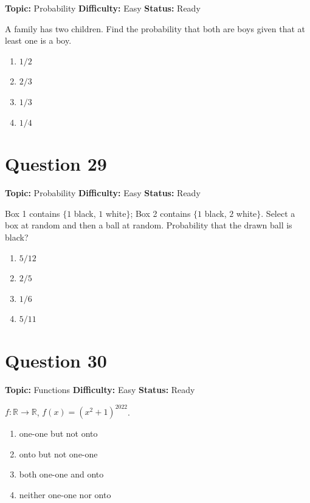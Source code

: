 \documentclass[11pt]{article}
\begin{document}
\noindent\textbf{Topic:} Probability \quad \textbf{Difficulty:} Easy \quad \textbf{Status:} Ready



A family has two children. Find the probability that both are boys given that at least one
is a boy.
\begin{enumerate}[label=(\Alph*)]
\item $1/2$
\item $2/3$
\item $1/3$
\item $1/4$
\end{enumerate}

\newpage

\section*{Question 29}


\noindent\textbf{Topic:} Probability \quad \textbf{Difficulty:} Easy \quad \textbf{Status:} Ready



Box 1 contains $\{1$ black, $1$ white$\}$; Box 2 contains $\{1$ black, $2$ white$\}$. Select a
box at random and then a ball at random. Probability that the drawn ball is black?
\begin{enumerate}[label=(\Alph*)]
\item $5/12$
\item $2/5$
\item $1/6$
\item $5/11$
\end{enumerate}

\newpage

\section*{Question 30}


\noindent\textbf{Topic:} Functions \quad \textbf{Difficulty:} Easy \quad \textbf{Status:} Ready



$f : \mathbb R \to \mathbb R$, $f(x) = (x^2 + 1)^{2022}$.
\begin{enumerate}[label=(\Alph*)]
\item one-one but not onto
\item onto but not one-one
\item both one-one and onto
\item neither one-one nor onto
\end{enumerate}
\end{document}

